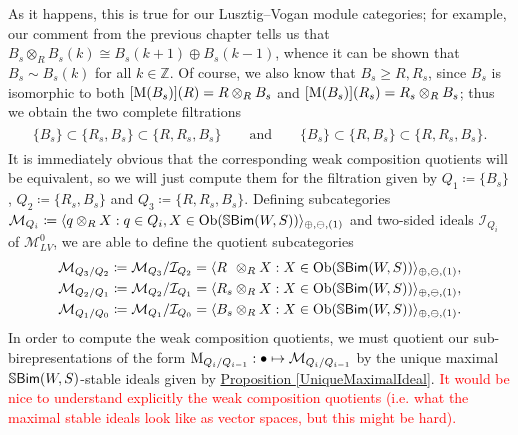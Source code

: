 \begin{example}
\noindent As it happens, this is true for our Lusztig--Vogan module categories; for example, our comment from the previous chapter tells us that $B_{s} \otimes_R B_{s}(k) \cong B_{s}(k+1) \oplus B_{s}(k-1)$, whence it can be shown that $B_{s} \sim B_{s}(k)$ for all $k \in \mathbb{Z}$. Of course, we also know that $B_{s} \geq R, R_{s}$, since $B_{s}$ is isomorphic to both $[\textnormal{M}(B_{s})](R) = R \otimes_R B_{s}$ and $[\textnormal{M}(B_{s})](R_{s}) = R_{s} \otimes_R B_{s}$; thus we obtain the two complete filtrations
\begin{align*}
\begin{split}
\{B_{s}\} \subset \{R_{s}, B_{s}\} \subset \{R, R_{s}, B_{s}\}\qquad\text{and}\qquad\{B_{s}\} \subset \{R, B_{s}\} \subset \{R, R_{s}, B_{s}\}.
\end{split}
\end{align*}
\noindent It is immediately obvious that the corresponding weak composition quotients will be equivalent, so we will just compute them for the filtration given by $Q_1 \coloneqq \{B_{s}\}$, $Q_2 \coloneqq \{R_{s}, B_{s}\}$ and $Q_3 \coloneqq \{R, R_{s}, B_{s}\}$. Defining subcategories $\mathcal{M}_{Q_i} \coloneqq \langle q \otimes_R X : q \in Q_i, X \in \textnormal{Ob}(\mathbb{S}\textnormal{\textsf{Bim}}(W, S))\rangle_{\oplus,\ominus,(1)}$ and two-sided ideals $\mathcal{I}_{Q_i}$ of $\mathcal{M}_{LV}^0$, we are able to define the quotient subcategories
\begin{align*}
\begin{split}
\mathcal{M}_{Q_3/Q_2} \coloneqq \mathcal{M}_{Q_3}/\mathcal{I}_{Q_2} = \langle R\hphantom{{}_{s}} \otimes_R X : X \in \obset(\mathbb{S}\textcat{Bim}(W, S))\rangle_{\oplus,\ominus,(1)},\\
\mathcal{M}_{Q_2/Q_1} \coloneqq \mathcal{M}_{Q_2}/\mathcal{I}_{Q_1} = \langle R_{s} \otimes_R X : X \in \obset(\mathbb{S}\textcat{Bim}(W, S))\rangle_{\oplus,\ominus,(1)},\\
\mathcal{M}_{Q_1/Q_0} \coloneqq \mathcal{M}_{Q_1}/\mathcal{I}_{Q_0} = \langle B_{s} \otimes_R X : X \in \obset(\mathbb{S}\textcat{Bim}(W, S))\rangle_{\oplus,\ominus,(1)}.
\end{split}
\end{align*}
\noindent In order to compute the weak composition quotients, we must quotient our sub-birepresentations of the form $\textnormal{M}_{Q_i/Q_{i-1}} : \bullet \mapsto \mathcal{M}_{Q_i/Q_{i-1}}$ by the unique maximal $\mathbb{S}\textnormal{\textsf{Bim}}(W, S)$-stable ideals given by \hyperref[UniqueMaximalIdeal]{Proposition \ref*{UniqueMaximalIdeal}}. \textcolor{red}{It would be nice to understand explicitly the weak composition quotients (i.e. what the maximal stable ideals look like as vector spaces, but this might be hard).}
\end{example}

